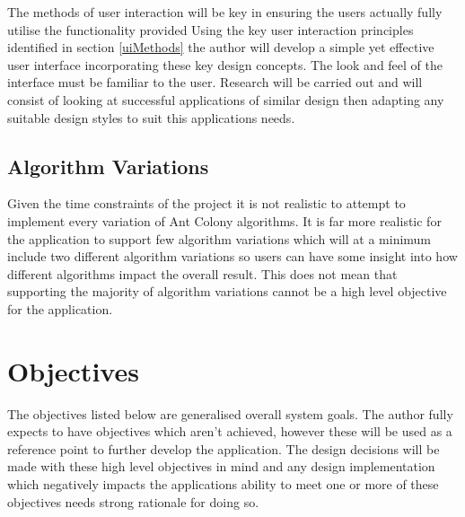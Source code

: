 The methods of user interaction will be key in ensuring the users actually fully utilise the functionality provided Using the key user interaction principles identified in section \ref{uiMethods} the author will develop a simple yet effective user interface incorporating these key design concepts. The look and feel of the interface must be familiar to the user. Research will be carried out and will consist of looking at successful applications of similar design then adapting any suitable design styles to suit this applications needs.

\subsection{Algorithm Variations}

Given the time constraints of the project it is not realistic to attempt to implement every variation of Ant Colony algorithms. It is far more realistic for the application to support few algorithm variations which will at a minimum include two different algorithm variations so users can have some insight into how different algorithms impact the overall result. This does not mean that supporting the majority of algorithm variations cannot be a high level objective for the application.

\section{Objectives}
\label{objy}
The objectives listed below are generalised overall system goals. The author fully expects to have objectives which aren’t achieved, however these will be used as a reference point to further develop the application. The design decisions will be made with these high level objectives in mind and any design implementation which negatively impacts the applications ability to meet one or more of these objectives needs strong rationale for doing so.

